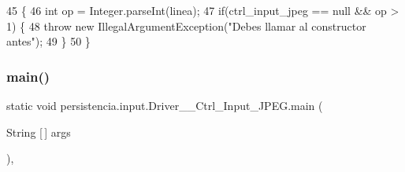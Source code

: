 \begin{DoxyCode}
45                                                                                           \{
46         \textcolor{keywordtype}{int} op = Integer.parseInt(linea);
47         \textcolor{keywordflow}{if}(ctrl\_input\_jpeg == null && op > 1) \{
48             \textcolor{keywordflow}{throw} \textcolor{keyword}{new} IllegalArgumentException(\textcolor{stringliteral}{"Debes llamar al constructor antes"});
49         \}
50     \}
\end{DoxyCode}
\mbox{\label{classpersistencia_1_1input_1_1Driver____Ctrl__Input__JPEG_ae46ec7babdaa3cf25854b21c693c4165}} 
\subsubsection{\texorpdfstring{main()}{main()}}
{\footnotesize\ttfamily static void persistencia.\+input.\+Driver\+\_\+\+\_\+\+Ctrl\+\_\+\+Input\+\_\+\+J\+P\+E\+G.\+main (\begin{DoxyParamCaption}\item[{String \mbox{[}$\,$\mbox{]}}]{args }\end{DoxyParamCaption})\hspace{0.3cm}{\ttfamily [inline]}, {\ttfamily [static]}}


